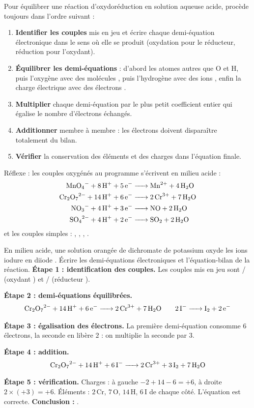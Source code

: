 \documentclass[11pt]{article}
\begin{document}
\begin{methode}
Pour équilibrer une réaction d'oxydoréduction en solution aqueuse acide, procède toujours dans l'ordre suivant :
\begin{enumerate}
\item \textbf{Identifier les couples} mis en jeu et écrire chaque demi-équation électronique dans le sens où elle se produit (oxydation pour le réducteur, réduction pour l'oxydant).
\item \textbf{Équilibrer les demi-équations} : d'abord les atomes autres que O et H, puis l'oxygène avec des molécules , puis l'hydrogène avec des ions , enfin la charge électrique avec des électrons .
\item \textbf{Multiplier} chaque demi-équation par le plus petit coefficient entier qui égalise le nombre d'électrons échangés.
\item \textbf{Additionner} membre à membre : les électrons doivent disparaître totalement du bilan.
\item \textbf{Vérifier} la conservation des éléments et des charges dans l'équation finale.
\end{enumerate}
Réflexe : les couples oxygénés au programme s'écrivent en milieu acide :
\begin{align*}
\ce{MnO4- + 8H+ + 5e- &-> Mn^2+ + 4H2O}\\
\ce{Cr2O7^2- + 14H+ + 6e- &-> 2Cr^3+ + 7H2O}\\
\ce{NO3- + 4H+ + 3e- &-> NO + 2H2O}\\
\ce{SO4^2- + 4H+ + 2e- &-> SO2 + 2H2O}
\end{align*}
et les couples simples : , , , .
\end{methode}

\begin{exoresolu}
En milieu acide, une solution orangée de dichromate de potassium oxyde les ions iodure  en diiode . Écrire les demi-équations électroniques et l'équation-bilan de la réaction.
\tcblower
\textbf{Étape 1 : identification des couples.} Les couples mis en jeu sont / (oxydant ) et / (réducteur ).

\textbf{Étape 2 : demi-équations équilibrées.}
\[
\ce{Cr2O7^2- + 14H+ + 6e- -> 2Cr^3+ + 7H2O} \qquad \ce{2I- -> I2 + 2e-}
\]

\textbf{Étape 3 : égalisation des électrons.} La première demi-équation consomme $6$ électrons, la seconde en libère $2$ : on multiplie la seconde par $3$.

\textbf{Étape 4 : addition.}
\[
\ce{Cr2O7^2- + 14H+ + 6I- -> 2Cr^3+ + 3I2 + 7H2O}
\]

\textbf{Étape 5 : vérification.} Charges : à gauche $-2+14-6=+6$, à droite $2\times(+3)=+6$. Éléments : $2\,\mathrm{Cr}$, $7\,\mathrm{O}$, $14\,\mathrm{H}$, $6\,\mathrm{I}$ de chaque côté. L'équation est correcte. \textbf{Conclusion :} .
\end{exoresolu}
\end{document}

